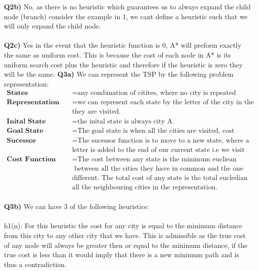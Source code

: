 \documentclass{article}
\newcommand\tab[1][1cm]{\hspace*{#1}}
\begin{document}
\begin{titlepage}
\textbf{Q2b)} No, as there is no heuristic which guarantees us to always expand the child node (branch) consider the example in 1, we cant define a heuristic such that we will only expand the child node. \\\\
\textbf{Q2c)} Yes in the event that the heuristic function is 0, A* will preform exactly the same as uniform cost. This is because the cost of each node in A* is its uniform search cost plus the heuristic and therefore if the heuristic is zero they will be the same. 
\newpage
\textbf{Q3a)} We can represent the TSP by the following problem representation:
\begin{align*}
\textbf{States} &= \text{any combination of citites, where no city is repeated twice.} \\
\textbf{Representation} &= \text{we can represent each state by the letter of the city in the order}\\
& \text{they are visited.} \\
\textbf{Inital State} &= \text{the inital state is always city A.} \\
\textbf{Goal State} &= \text{The goal state is when all the cities are visited, cost minimized.} \\
\textbf{Sucessor Function} &= \text{The sucessor function is to move to a new state, where a new city} \\
& \text{letter is added to the end of our current state i.e we visit a new city.} \\
\textbf{Cost Function} &= \text{The cost between any state is the minimum eucliean distance } \\
& \text{ between all the cities they have in common and the one city they have}\\
& \text{different. The total cost of any state is the total eucledian distance between} \\
& \text{all the neighbouring cities in the representation.}
\end{align*}\\
\textbf{Q3b)} We can have 3 of the following heuristics: \\\\
\tab h1(n): For this heuristic the cost for any city is equal to the minimum distance from this city to any other city that we have. This is admissible as the true cost of any node will always be greater then or equal to the minimum distance, if the true cost is less than it would imply that there is a new minimum path and is thus a contradiction. \\\\

\end{titlepage}
\end{document}
